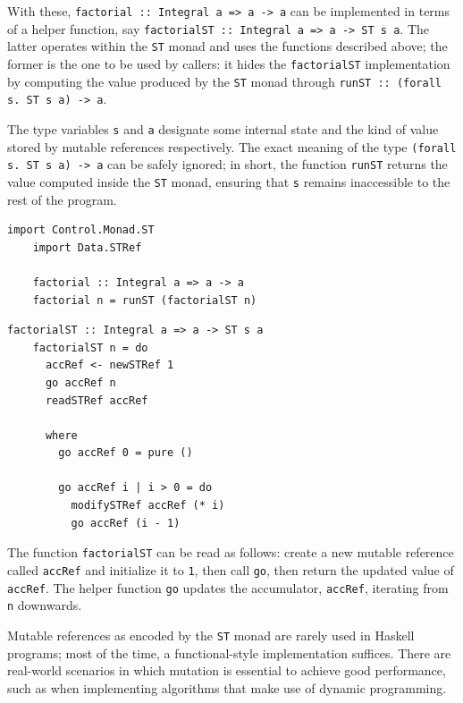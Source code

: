 \documentclass[UdineBachThesis,american,11pt]{PhdThesis}
\begin{document}
  With these, \mbox{\texttt{factorial :: Integral a => a -> a}} can be
  implemented in terms of a helper function, say
  \mbox{\texttt{factorialST :: Integral a => a -> ST s a}}. The latter operates
  within the \mbox{\texttt{ST}} monad and uses the functions described above;
  the former is the one to be used by callers: it hides the
  \mbox{\texttt{factorialST}} implementation by computing the value produced by
  the \mbox{\texttt{ST}} monad through
  \mbox{\texttt{runST :: (forall s. ST s a) -> a}}.

  The type variables \texttt{s} and \texttt{a} designate some internal state and
  the kind of value stored by mutable references respectively. The exact meaning
  of the type \mbox{\texttt{(forall s. ST s a) -> a}} can be safely ignored; in
  short, the function \mbox{\texttt{runST}} returns the value computed inside
  the \mbox{\texttt{ST}} monad, ensuring that \texttt{s} remains inaccessible to
  the rest of the program.

  \begin{Verbatim}[gobble=4,fontsize=\small]
    import Control.Monad.ST
    import Data.STRef

    factorial :: Integral a => a -> a
    factorial n = runST (factorialST n)
  \end{Verbatim}

  \pagebreak

  \begin{Verbatim}[gobble=4,fontsize=\small]
    factorialST :: Integral a => a -> ST s a
    factorialST n = do
      accRef <- newSTRef 1
      go accRef n
      readSTRef accRef

      where
        go accRef 0 = pure ()

        go accRef i | i > 0 = do
          modifySTRef accRef (* i)
          go accRef (i - 1)
  \end{Verbatim}

  The function \mbox{\texttt{factorialST}} can be read as follows: create a new
  mutable reference called \mbox{\texttt{accRef}} and initialize it to
  \texttt{1}, then call \mbox{\texttt{go}}, then return the updated value of
  \mbox{\texttt{accRef}}. The helper function \mbox{\texttt{go}} updates the
  accumulator, \mbox{\texttt{accRef}}, iterating from \texttt{n} downwards.

  Mutable references as encoded by the \mbox{\texttt{ST}} monad are rarely used
  in Haskell programs; most of the time, a functional-style implementation
  suffices. There are real-world scenarios in which mutation is essential to
  achieve good performance, such as when implementing algorithms that make use
  of dynamic programming.
\end{document}
